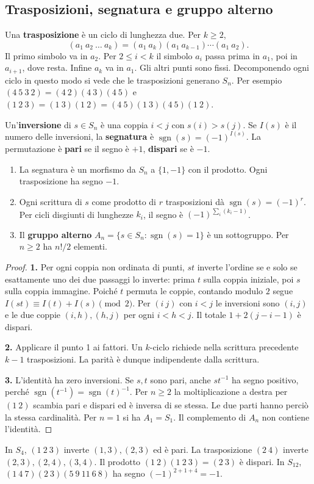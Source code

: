 \subsection{Trasposizioni, segnatura e gruppo alterno}
Una \textbf{trasposizione} è un ciclo di lunghezza due. Per $k\ge2$,
\[
 (a_1\ a_2\ \ldots\ a_k)=(a_1\ a_k)(a_1\ a_{k-1})\cdots(a_1\ a_2).
\]
Il primo simbolo va in $a_2$. Per $2\le i<k$ il simbolo $a_i$ passa prima in $a_1$, poi in $a_{i+1}$, dove resta. Infine $a_k$ va in $a_1$. Gli altri punti sono fissi. Decomponendo ogni ciclo in questo modo si vede che le trasposizioni generano $S_n$. Per esempio $(4\ 5\ 3\ 2)=(4\ 2)(4\ 3)(4\ 5)$ e $(1\ 2\ 3)=(1\ 3)(1\ 2)=(4\ 5)(1\ 3)(4\ 5)(1\ 2)$.

\begin{definizione}
Un'\textbf{inversione} di $s\in S_n$ è una coppia $i<j$ con $s(i)>s(j)$. Se $I(s)$ è il numero delle inversioni, la \textbf{segnatura} è $\operatorname{sgn}(s)=(-1)^{I(s)}$. La permutazione è \textbf{pari} se il segno è $+1$, \textbf{dispari} se è $-1$.
\end{definizione}
\begin{proposizione}
\begin{enumerate}
\item La segnatura è un morfismo da $S_n$ a $\{1,-1\}$ con il prodotto. Ogni trasposizione ha segno $-1$.
\item Ogni scrittura di $s$ come prodotto di $r$ trasposizioni dà $\operatorname{sgn}(s)=(-1)^r$. Per cicli disgiunti di lunghezze $k_i$, il segno è $(-1)^{\sum_i(k_i-1)}$.
\item Il \textbf{gruppo alterno} $A_n=\{s\in S_n:\operatorname{sgn}(s)=1\}$ è un sottogruppo. Per $n\ge2$ ha $n!/2$ elementi.
\end{enumerate}
\end{proposizione}
\begin{proof}
\textbf{1.} Per ogni coppia non ordinata di punti, $st$ inverte l'ordine se e solo se esattamente uno dei due passaggi lo inverte: prima $t$ sulla coppia iniziale, poi $s$ sulla coppia immagine. Poiché $t$ permuta le coppie, contando modulo $2$ segue $I(st)\equiv I(t)+I(s)\pmod2$. Per $(i\ j)$ con $i<j$ le inversioni sono $(i,j)$ e le due coppie $(i,h),(h,j)$ per ogni $i<h<j$. Il totale $1+2(j-i-1)$ è dispari.

\textbf{2.} Applicare il punto 1 ai fattori. Un $k$-ciclo richiede nella scrittura precedente $k-1$ trasposizioni. La parità è dunque indipendente dalla scrittura.

\textbf{3.} L'identità ha zero inversioni. Se $s,t$ sono pari, anche $st^{-1}$ ha segno positivo, perché $\operatorname{sgn}(t^{-1})=\operatorname{sgn}(t)^{-1}$. Per $n\ge2$ la moltiplicazione a destra per $(1\ 2)$ scambia pari e dispari ed è inversa di se stessa. Le due parti hanno perciò la stessa cardinalità. Per $n=1$ si ha $A_1=S_1$. Il complemento di $A_n$ non contiene l'identità.
\end{proof}
\begin{esempio}
In $S_4$, $(1\ 2\ 3)$ inverte $(1,3),(2,3)$ ed è pari. La trasposizione $(2\ 4)$ inverte $(2,3),(2,4),(3,4)$. Il prodotto $(1\ 2)(1\ 2\ 3)=(2\ 3)$ è dispari. In $S_{12}$, $(1\ 4\ 7)(2\ 3)(5\ 9\ 11\ 6\ 8)$ ha segno $(-1)^{2+1+4}=-1$.
\end{esempio}
